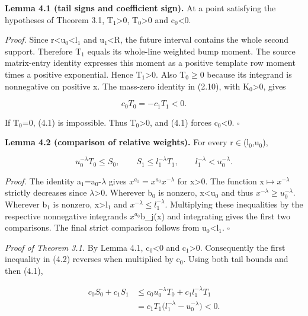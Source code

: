 \documentclass[11pt,a4paper]{article}
\begin{document}
\textbf{Lemma 4.1 (tail signs and coefficient sign).} At a point satisfying the hypotheses of Theorem 3.1, T\ensuremath{{}_1}>0, T\ensuremath{{}_0}>0 and c\ensuremath{{}_0}<0.

\emph{Proof.} Since r<u\ensuremath{{}_0}<l\ensuremath{{}_1} and u\ensuremath{{}_1}<R, the future interval contains the whole second support. Therefore T\ensuremath{{}_1} equals its whole-line weighted bump moment. The source matrix-entry identity expresses this moment as a positive template row moment times a positive exponential. Hence T\ensuremath{{}_1}>0. Also T\ensuremath{{}_0}\ensuremath{\ge}0 because its integrand is nonnegative on positive x. The mass-zero identity in (2.10), with K\ensuremath{{}_0}>0, gives

\[
c_0T_0=-c_1T_1<0. \tag{4.1}
\]

If T\ensuremath{{}_0}=0, (4.1) is impossible. Thus T\ensuremath{{}_0}>0, and (4.1) forces c\ensuremath{{}_0}<0. \hfill\ensuremath{\square}

\textbf{Lemma 4.2 (comparison of relative weights).} For every r\ensuremath{\in}(l\ensuremath{{}_0},u\ensuremath{{}_0}),

\[
u_0^{-\lambda}T_0\le S_0,\qquad
S_1\le l_1^{-\lambda}T_1,\qquad
l_1^{-\lambda}<u_0^{-\lambda}. \tag{4.2}
\]

\emph{Proof.} The identity a\ensuremath{{}_1}=a\ensuremath{{}_0}-\ensuremath{\lambda} gives \(x^{a_1}=x^{a_0}\)\(x^{-\lambda }\) for x>0. The function x\ensuremath{\mapsto}\(x^{-\lambda }\) strictly decreases since \ensuremath{\lambda}>0. Wherever b\ensuremath{{}_0} is nonzero, x<u\ensuremath{{}_0} and thus \(x^{-\lambda }\ge u_0^{-\lambda }\). Wherever b\ensuremath{{}_1} is nonzero, x>l\ensuremath{{}_1} and \(x^{-\lambda }\le l_1^{-\lambda }\). Multiplying these inequalities by the respective nonnegative integrands \(x^{a_0}\)b\_j(x) and integrating gives the first two comparisons. The final strict comparison follows from u\ensuremath{{}_0}<l\ensuremath{{}_1}. \hfill\ensuremath{\square}

\emph{Proof of Theorem 3.1.} By Lemma 4.1, c\ensuremath{{}_0}<0 and c\ensuremath{{}_1}>0. Consequently the first inequality in (4.2) reverses when multiplied by c\ensuremath{{}_0}. Using both tail bounds and then (4.1),

\[
\begin{aligned}
c_0S_0+c_1S_1
&\le c_0u_0^{-\lambda}T_0+c_1l_1^{-\lambda}T_1\\
&=c_1T_1\bigl(l_1^{-\lambda}-u_0^{-\lambda}\bigr)<0.
\end{aligned} \tag{4.3}
\]
\end{document}

